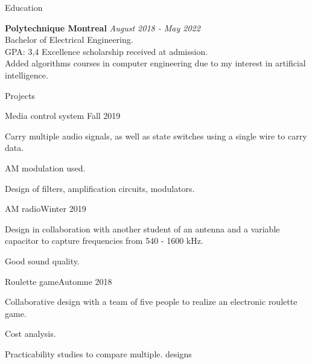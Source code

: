 \documentclass{resume} %
\begin{document}
	
	
	\begin{rSection}{Education}
		
		{\bf Polytechnique Montreal} \hfill {\em August 2018 - May 2022} 
		\\ Bachelor of Electrical Engineering.
		\\GPA: 3,4 \hspace{0.5cm}  Excellence scholarship received at admission.
		\\Added algorithms courses in computer engineering due to my interest in artificial intelligence.
		
	\end{rSection}
	
	\begin{rSection}{Projects}
		
		\begin{rSubsection}{Media control system }{Fall 2019}{}{}
			\item   Carry multiple audio signals, as well as state switches using a single wire to carry data.
			\item   AM modulation used.
			\item   Design of filters, amplification circuits, modulators.
			
		\end{rSubsection}
		
		\begin{rSubsection}{AM radio}{Winter 2019}{}{}
			\item   Design in collaboration with another student of an antenna and a variable capacitor to capture frequencies from 540 - 1600 kHz.
			\item   Good sound quality.
			
		\end{rSubsection}
		
		\begin{rSubsection}{Roulette game}{Automne 2018}{}{}
			\item  Collaborative design with a team of five people to realize an electronic roulette game.
			\item  Cost analysis.
			\item  Practicability studies to compare multiple. designs
		\end{rSubsection} 
		
	\end{rSection}
	
\end{document}
